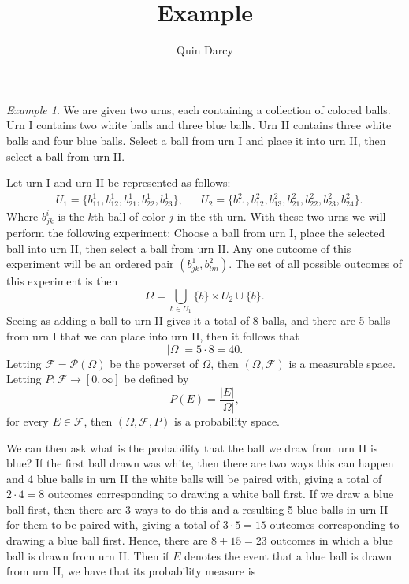 \documentclass{article}
\theoremstyle{definition}
\theoremstyle{remark}
\theoremstyle{example}
\newtheorem{example}{Example}
\begin{document}
\title{Example}
\author{Quin Darcy}
\maketitle

\begin{example}
We are given two urns, each containing a collection of colored
balls. Urn I contains two white balls and three blue balls. Urn
II contains three white balls and four blue balls. Select a ball from urn I
and place it into urn II, then select a ball from urn II. 
\end{example}

Let urn I and urn II be represented as follows:
\begin{align*}
    &U_1=\{b^1_{11}, b^1_{12}, b^1_{21}, b^1_{22}, b^1_{23}\}, & &U_2=\{b^2_{11}, b^2_{12}, b^2_{13}, b^2_{21}, b^2_{22}, b^2_{23}, b^2_{24}\}.
\end{align*}
Where $b^i_{jk}$ is the $k$th ball of color $j$ in the $i$th urn. With these two urns we will perform the following experiment: Choose a ball from urn I, place the selected ball into urn II, then select a ball from urn II. Any one outcome of this experiment will be an ordered pair $(b^1_{jk}, b^2_{lm})$. The set of all possible outcomes of this experiment is then 
\begin{equation*}
    \Omega=\bigcup_{b\in U_1}\{b\}\times U_2\cup\{b\}.
\end{equation*}
Seeing as adding a ball to urn II gives it a total of 8 balls, and there are 5 balls from urn I that we can place into urn II, then it follows that 
\begin{equation*}
    |\Omega|=5\cdot 8=40. 
\end{equation*}
Letting $\mathcal{F}=\mathcal{P}(\Omega)$ be the powerset of $\Omega$, then $(\Omega, \mathcal{F})$ is a measurable space. Letting $P:\mathcal{F}\to[0, \infty]$ be defined by 
\begin{equation*}
    P(E)=\frac{|E|}{|\Omega|},
\end{equation*}
for every $E\in\mathcal{F}$, then $(\Omega, \mathcal{F}, P)$ is a probability space.\par We can then ask what is the probability that the ball we draw from urn II is blue? If the first ball drawn was white, then there are two ways this can happen and 4 blue balls in urn II the white balls will be paired with, giving a total of $2\cdot 4=8$ outcomes corresponding to drawing a white ball first. If we draw a blue ball first, then there are 3 ways to do this and a resulting 5 blue balls in urn II for them to be paired with, giving a total of $3\cdot 5=15$ outcomes corresponding to drawing a blue ball first. Hence, there are $8+15=23$ outcomes in which a blue ball is drawn from urn II. Then if $E$ denotes the event that a blue ball is drawn from urn II, we have that its probability measure is
\end{document}
